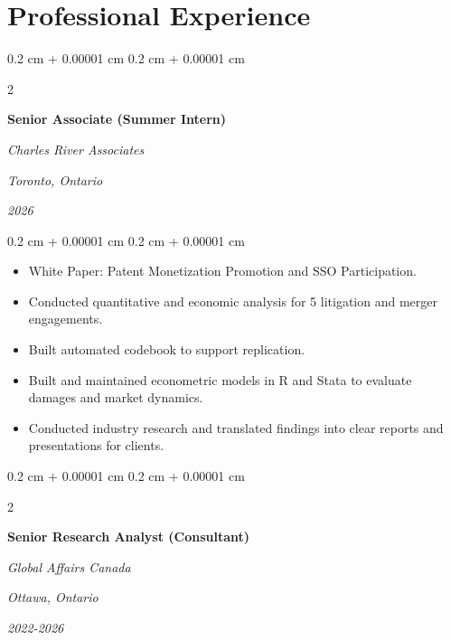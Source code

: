 \documentclass[10pt, letterpaper]{article}
\newenvironment{highlights}{
    \begin{itemize}[
        topsep=0.10 cm,
        parsep=0.10 cm,
        partopsep=0pt,
        itemsep=0pt,
        leftmargin=0.4 cm + 10pt
    ]
}{
    \end{itemize}
} %
\newenvironment{onecolentry}{
    \begin{adjustwidth}{
        0.2 cm + 0.00001 cm
    }{
        0.2 cm + 0.00001 cm
    }
}{
    \end{adjustwidth}
} %
\newenvironment{twocolentry}[2][]{
    \onecolentry
    \def\secondColumn{#2}
    \setcolumnwidth{\fill, 4.5 cm}
    \begin{paracol}{2}
}{
    \switchcolumn \raggedleft \secondColumn
    \end{paracol}
    \endonecolentry
} %
\begin{document}
    \section{Professional Experience}

        \begin{twocolentry}{
\textit{Toronto, Ontario}

\textit{2026}}
    \textbf{Senior Associate (Summer Intern)}
    
    \textit{Charles River Associates}
\end{twocolentry}
\vspace{0.10 cm}
\begin{onecolentry}
    \begin{highlights}
        \item White Paper: Patent Monetization Promotion and SSO Participation.
        \item Conducted quantitative and economic analysis for 5 litigation and merger engagements.
        \item Built automated codebook to support replication.
        \item Built and maintained econometric models in R and Stata to evaluate damages and market dynamics.
        \item Conducted industry research and translated findings into clear reports and presentations for clients.
    \end{highlights}
    \end{onecolentry}
    \vspace{0.2 cm}
            
        \begin{twocolentry}{
        \textit{Ottawa, Ontario}    
            
        \textit{2022-2026}}
            \textbf{Senior Research Analyst (Consultant)}
            
            \textit{Global Affairs Canada}
        \end{twocolentry}
\end{document}
